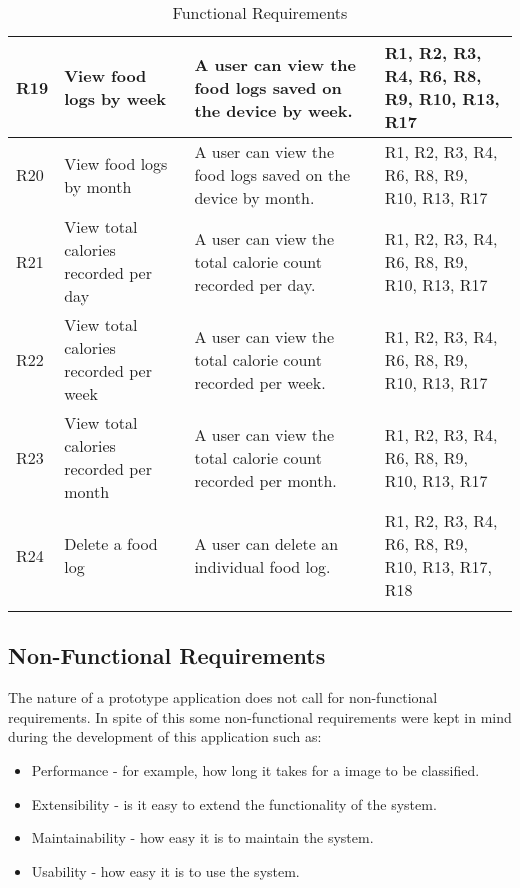 \begin{longtable}{|p{.75cm}|p{3.5cm}|p{6cm}|p{2.5cm}|}
R19         & View food logs by week                                      & A user can view the food logs saved on the device by week.                                              & R1, R2, R3, R4, R6, R8, R9, R10, R13, R17      \\ \hline
R20         & View food logs by month                                     & A user can view the food logs saved on the device by month.                                             & R1, R2, R3, R4, R6, R8, R9, R10, R13, R17      \\ \hline
R21         & View total calories recorded per day                        & A user can view the total calorie count recorded per day.                                               & R1, R2, R3, R4, R6, R8, R9, R10, R13, R17      \\ \hline
R22         & View total calories recorded per week                       & A user can view the total calorie count recorded per week.                                              & R1, R2, R3, R4, R6, R8, R9, R10, R13, R17      \\ \hline
R23         & View total calories recorded per month                      & A user can view the total calorie count recorded per month.                                             & R1, R2, R3, R4, R6, R8, R9, R10, R13, R17      \\ \hline
R24         & Delete a food log                                           & A user can delete an individual food log.                                                               & R1, R2, R3, R4, R6, R8, R9, R10, R13, R17, R18 \\ \hline
\caption{Functional Requirements}
\label{requirements}
\end{longtable}

\tocless\subsection{Non-Functional Requirements}
The nature of a prototype application does not call for non-functional requirements.
In spite of this some non-functional requirements were kept in mind during the development of this application such as:
\begin{itemize}
	\item{Performance - for example, how long it takes for a image to be classified.}
	\item{Extensibility - is it easy to extend the functionality of the system.}
	\item{Maintainability - how easy it is to maintain the system.}
	\item{Usability - how easy it is to use the system.}
\end{itemize}

\clearpage